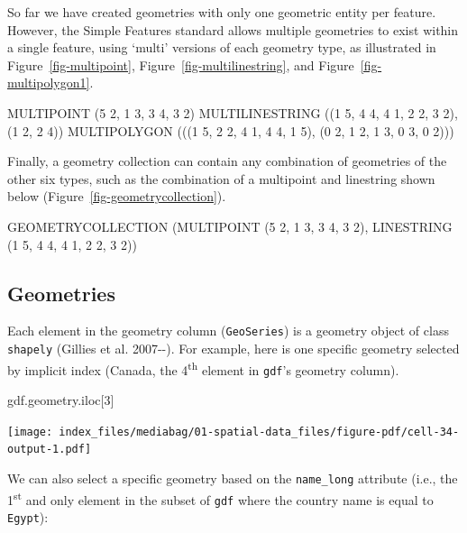 \documentclass[
  letterpaper,
]{krantz}
\newenvironment{Shaded}{\begin{snugshade}}{\end{snugshade}}
\newcommand{\DecValTok}[1]{\textcolor[rgb]{0.68,0.00,0.00}{#1}}
\newcommand{\NormalTok}[1]{\textcolor[rgb]{0.00,0.23,0.31}{#1}}
\begin{document}
So far we have created geometries with only one geometric entity per
feature. However, the Simple Features standard allows multiple
geometries to exist within a single feature, using `multi' versions of
each geometry type, as illustrated in Figure~\ref{fig-multipoint},
Figure~\ref{fig-multilinestring}, and Figure~\ref{fig-multipolygon1}.

\begin{Shaded}
\begin{Highlighting}[]
\NormalTok{MULTIPOINT (5 2, 1 3, 3 4, 3 2)}
\NormalTok{MULTILINESTRING ((1 5, 4 4, 4 1, 2 2, 3 2), (1 2, 2 4))}
\NormalTok{MULTIPOLYGON (((1 5, 2 2, 4 1, 4 4, 1 5), (0 2, 1 2, 1 3, 0 3, 0 2)))}
\end{Highlighting}
\end{Shaded}

Finally, a geometry collection can contain any combination of geometries
of the other six types, such as the combination of a multipoint and
linestring shown below (Figure~\ref{fig-geometrycollection}).

\begin{Shaded}
\begin{Highlighting}[]
\NormalTok{GEOMETRYCOLLECTION (MULTIPOINT (5 2, 1 3, 3 4, 3 2),}
\NormalTok{                    LINESTRING (1 5, 4 4, 4 1, 2 2, 3 2))}
\end{Highlighting}
\end{Shaded}

\subsection{Geometries}\label{sec-geometries}

Each element in the geometry column (\texttt{GeoSeries}) is a geometry
object of class \texttt{shapely} (Gillies et al. 2007-\/-). For example,
here is one specific geometry selected by implicit index (Canada, the
4\textsuperscript{th} element in \texttt{gdf}'s geometry column).

\begin{Shaded}
\begin{Highlighting}[]
\NormalTok{gdf.geometry.iloc[}\DecValTok{3}\NormalTok{]}
\end{Highlighting}
\end{Shaded}

\texttt{[image: index\_files/mediabag/01-spatial-data\_files/figure-pdf/cell-34-output-1.pdf]}

We can also select a specific geometry based on the
\texttt{\textquotesingle{}name\_long\textquotesingle{}} attribute (i.e.,
the 1\textsuperscript{st} and only element in the subset of \texttt{gdf}
where the country name is equal to \texttt{Egypt}):
\end{document}
